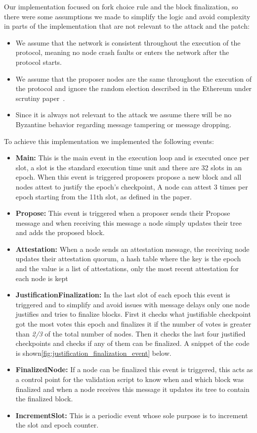 Our implementation focused on fork choice rule and the block finalization, so there were some assumptions we made
to simplify the logic and avoid complexity in parts of the implementation that are not relevant to the attack and the patch:
\begin{itemize}
    \item We assume that the network is consistent throughout the execution of the protocol, meaning no node crash faults
or enters the network after the protocol starts.
    \item We assume that the proposer nodes are the same throughout the execution of the protocol and ignore the random election
described in the Ethereum under scrutiny paper~\cite{ethereum_analysis}.
    \item Since it is always not relevant to the attack we assume there will be no Byzantine behavior regarding message
tampering or message dropping.
\end{itemize}

To achieve this implementation we implemented the following events:

\begin{itemize}
    \item \textbf{Main:} This is the main event in the execution loop and is executed once per slot, a slot is the standard execution time unit and
    there are 32 slots in an epoch. When this event is triggered proposers propose a new block and all nodes attest to justify the epoch's checkpoint,
    A node can attest 3 times per epoch starting from the 11th slot, as defined in the paper.
    \item \textbf{Propose:} This event is triggered when a proposer sends their Propose message and when receiving this message a node simply updates their tree
    and adds the proposed block.
    \item \textbf{Attestation:} When a node sends an attestation message, the receiving node updates their attestation quorum, a hash table where the key is
    the epoch and the value is a list of attestations, only the most recent attestation for each node is kept
    \item \textbf{JustificationFinalization:} In the last slot of each epoch this event is triggered and to simplify and avoid issues with message delays only
    one node justifies and tries to finalize blocks. First it checks what justifiable checkpoint got the most votes this epoch and finalizes it if the number
    of votes is greater than \textit{2/3} of the total number of nodes. Then it checks the last four justified checkpoints and checks if any of them can be finalized.
    A snippet of the code is shown\ref{fig:justification_finalization_event} below.
    \item \textbf{FinalizedNode:} If a node can be finalized this event is triggered, this acts as a control point for the validation script to know when and which block
    was finalized and when a node receives this message it updates its tree to contain the finalized block.
    \item \textbf{IncrementSlot:} This is a periodic event whose sole purpose is to increment the slot and epoch counter.
\end{itemize}

